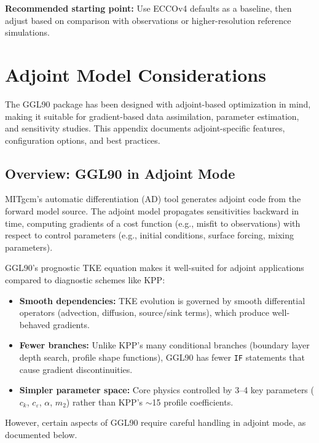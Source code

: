 \documentclass[12pt,letterpaper]{article}
\begin{document}
\textbf{Recommended starting point:} Use ECCOv4 defaults as a baseline, then adjust based on comparison with observations or higher-resolution reference simulations.

\section{Adjoint Model Considerations}
\label{app:adjoint_considerations}

The GGL90 package has been designed with adjoint-based optimization in mind, making it suitable for gradient-based data assimilation, parameter estimation, and sensitivity studies. This appendix documents adjoint-specific features, configuration options, and best practices.

\subsection{Overview: GGL90 in Adjoint Mode}

MITgcm's automatic differentiation (AD) tool generates adjoint code from the forward model source. The adjoint model propagates sensitivities backward in time, computing gradients of a cost function (e.g., misfit to observations) with respect to control parameters (e.g., initial conditions, surface forcing, mixing parameters).

GGL90's prognostic TKE equation makes it well-suited for adjoint applications compared to diagnostic schemes like KPP:

\begin{itemize}[leftmargin=*]
  \item \textbf{Smooth dependencies:} TKE evolution is governed by smooth differential operators (advection, diffusion, source/sink terms), which produce well-behaved gradients.
  \item \textbf{Fewer branches:} Unlike KPP's many conditional branches (boundary layer depth search, profile shape functions), GGL90 has fewer \texttt{IF} statements that cause gradient discontinuities.
  \item \textbf{Simpler parameter space:} Core physics controlled by 3--4 key parameters ($c_k$, $c_\varepsilon$, $\alpha$, $m_2$) rather than KPP's $\sim$15 profile coefficients.
\end{itemize}

However, certain aspects of GGL90 require careful handling in adjoint mode, as documented below.
\end{document}
